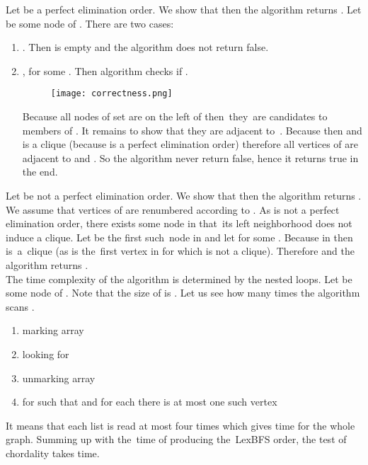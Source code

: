 \documentclass[a4paper, 11pt]{article}
\begin{document}
Let  be a perfect elimination order. We show that then the algorithm returns . 
Let  be some node of . There are two cases:

\begin{enumerate}
    \item . 
        Then  is empty and the algorithm does not return false. 
    \item , for some .
        Then algorithm checks if . 
    
        \begin{figure}[h!]
            \begin{center}
                \texttt{[image: correctness.png]}
            \end{center}
        \end{figure}

        
        Because all nodes of set  are on the left of  then~they~are 
        candidates to members of . It remains to show that they are adjacent to~. 
        Because  then  and  is a clique (because  is a perfect 
        elimination order) therefore all vertices of  are adjacent to  and 
        . So the algorithm never return false, hence it returns
        true in the end.
\end{enumerate}

Let  be not a perfect elimination order. We show that then the algorithm returns .
We assume that vertices of  are renumbered according to . As  is not a perfect 
elimination order, there exists some node in  that~its left neighborhood does not induce 
a clique. Let  be the first such~node in  and let  for some . Because  
in  then  is~a~clique (as  is the~first vertex in  for which  is not 
a clique). Therefore  and the algorithm returns .\\

The time complexity of the algorithm is determined by the nested loops. Let  be some node of . 
Note that the size of  is . Let us see how many times the algorithm scans . 

\begin{enumerate}
    \item marking  array
    \item looking for  
    \item unmarking  array
    \item for  such that  and for each  there is at most one such vertex~
\end{enumerate}

It means that each list  is read at most four times which gives  time for the whole 
graph. Summing up with the~time of producing the~LexBFS order, the test of chordality takes 
 time.
\end{document}
